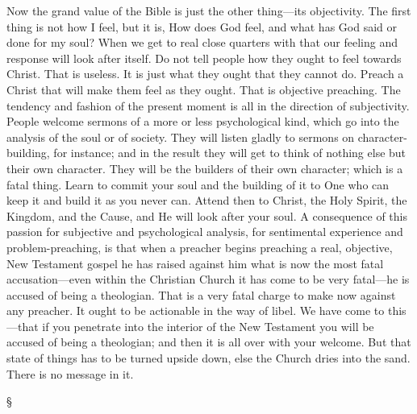 \documentclass[12pt,a5paper,twoside,titlepage]{book}
\begin{document}
Now the grand value of the Bible is just the 
other thing---its objectivity. The first thing is 
not how I feel, but it is, How does God feel, 
and what has God said or done for my soul? 
When we get to real close quarters with that 
our feeling and response will look after itself. 
Do not tell people how they ought to feel 
towards Christ. That is useless. It is just 
what they ought that they cannot do. Preach 
a Christ that will make them feel as they ought. 
That is objective preaching. The tendency and 
fashion of the present moment is all in the 
direction of subjectivity. People welcome 
sermons of a more or less psychological kind, 
which go into the analysis of the soul or of 
society. They will listen gladly to sermons on 
character-building, for instance; and in the 
result they will get to think of nothing else 
but their own character. They will be the 
builders of their own character; which is a 
fatal thing. Learn to commit your soul and 
the building of it to One who can keep it 
and build it as you never can. Attend then to 
Christ, the Holy Spirit, the Kingdom, and the 
Cause, and He will look after your soul. A 
consequence of this passion for subjective and 
psychological analysis, for sentimental experience 
and problem-preaching, is that when 
a preacher begins preaching a real, objective, 
New Testament gospel he has raised against 
him what is now the most fatal accusation---even 
within the Christian Church it has come 
to be very fatal---he is accused of being a 
theologian. That is a very fatal charge to 
make now against any preacher. It ought to 
be actionable in the way of libel. We have 
come to this---that if you penetrate into the 
interior of the New Testament you will be 
accused of being a theologian; and then it is 
all over with your welcome. But that state 
of things has to be turned upside down, else 
the Church dries into the sand. There is no 
message in it. 

\begin{center}
\S
\end{center}
\end{document}
